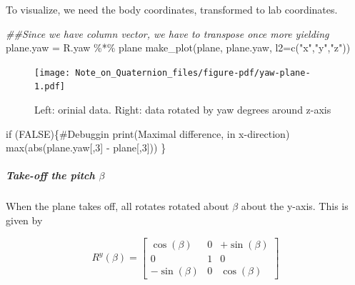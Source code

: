 \documentclass[
  letterpaper,
  DIV=11,
  numbers=noendperiod]{scrartcl}
\let\oldsubparagraph\subparagraph
\renewcommand{\subparagraph}[1]{\oldsubparagraph{#1}\mbox{}}
\newenvironment{Shaded}{\begin{snugshade}}{\end{snugshade}}
\newcommand{\AttributeTok}[1]{\textcolor[rgb]{0.40,0.45,0.13}{#1}}
\newcommand{\CommentTok}[1]{\textcolor[rgb]{0.37,0.37,0.37}{#1}}
\newcommand{\ConstantTok}[1]{\textcolor[rgb]{0.56,0.35,0.01}{#1}}
\newcommand{\ControlFlowTok}[1]{\textcolor[rgb]{0.00,0.23,0.31}{#1}}
\newcommand{\DecValTok}[1]{\textcolor[rgb]{0.68,0.00,0.00}{#1}}
\newcommand{\DocumentationTok}[1]{\textcolor[rgb]{0.37,0.37,0.37}{\textit{#1}}}
\newcommand{\FunctionTok}[1]{\textcolor[rgb]{0.28,0.35,0.67}{#1}}
\newcommand{\NormalTok}[1]{\textcolor[rgb]{0.00,0.23,0.31}{#1}}
\newcommand{\OtherTok}[1]{\textcolor[rgb]{0.00,0.23,0.31}{#1}}
\newcommand{\SpecialCharTok}[1]{\textcolor[rgb]{0.37,0.37,0.37}{#1}}
\newcommand{\StringTok}[1]{\textcolor[rgb]{0.13,0.47,0.30}{#1}}
\begin{document}
To visualize, we need the body coordinates, transformed to lab
coordinates.

\begin{Shaded}
\begin{Highlighting}[]
\DocumentationTok{\#\#Since we have column vector, we have to transpose once more yielding}
\NormalTok{plane.yaw  }\OtherTok{=}\NormalTok{ R.yaw }\SpecialCharTok{\%*\%}\NormalTok{ plane }
\FunctionTok{make\_plot}\NormalTok{(plane, plane.yaw, }\AttributeTok{l2=}\FunctionTok{c}\NormalTok{(}\StringTok{"x\textquotesingle{}"}\NormalTok{,}\StringTok{"y\textquotesingle{}"}\NormalTok{,}\StringTok{"z\textquotesingle{}"}\NormalTok{))}
\end{Highlighting}
\end{Shaded}

\begin{figure}[H]

{\centering \texttt{[image: Note\_on\_Quaternion\_files/figure-pdf/yaw-plane-1.pdf]}

}

\caption{Left: orinial data. Right: data rotated by yaw degrees around
z-axis}

\end{figure}

\begin{Shaded}
\begin{Highlighting}[]
\ControlFlowTok{if}\NormalTok{ (}\ConstantTok{FALSE}\NormalTok{)\{}\CommentTok{\#Debuggin}
  \FunctionTok{print}\NormalTok{(}\StringTok{\textquotesingle{}Maximal difference, in x{-}direction\textquotesingle{}}\NormalTok{)}
  \FunctionTok{max}\NormalTok{(}\FunctionTok{abs}\NormalTok{(plane.yaw[,}\DecValTok{3}\NormalTok{] }\SpecialCharTok{{-}}\NormalTok{ plane[,}\DecValTok{3}\NormalTok{]))}
\NormalTok{\}}
\end{Highlighting}
\end{Shaded}

\hypertarget{take-off-the-pitch-beta}{%
\subparagraph{\texorpdfstring{Take-off the pitch
\(\beta\)}{Take-off the pitch \textbackslash beta}}\label{take-off-the-pitch-beta}}

When the plane takes off, all rotates rotated about \(\beta\) about the
y-axis. This is given by

\[
  R^y(\beta) = \begin{bmatrix}\cos(\beta) & 0 & +\sin(\beta)\\
   0 & 1 & 0 \\
  -\sin(\beta) & 0 & \cos(\beta)\end{bmatrix}
\]
\end{document}
